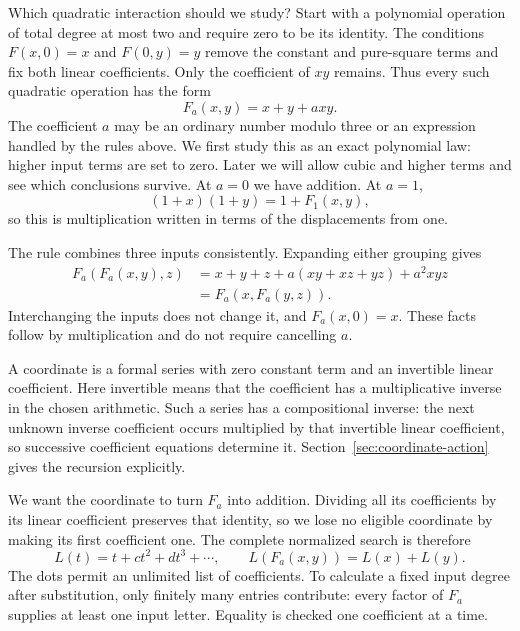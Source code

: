\documentclass[11pt,letterpaper]{article}
\numberwithin{equation}{section}
\theoremstyle{definition}\newtheorem{example}[theorem]{Example}
\begin{document}
Which quadratic interaction should we study? Start with a polynomial operation of total degree at most two and require zero to be its identity. The conditions \(F(x,0)=x\) and \(F(0,y)=y\) remove the constant and pure-square terms and fix both linear coefficients. Only the coefficient of \(xy\) remains. Thus every such quadratic operation has the form
\begin{equation}\label{eq:family}
 F_a(x,y)=x+y+a xy.
\end{equation}
The coefficient \(a\) may be an ordinary number modulo three or an expression handled by the rules above. We first study this as an exact polynomial law: higher input terms are set to zero. Later we will allow cubic and higher terms and see which conclusions survive. At \(a=0\) we have addition. At \(a=1\),
\[
 (1+x)(1+y)=1+F_1(x,y),
\]
so this is multiplication written in terms of the displacements from one.

The rule combines three inputs consistently. Expanding either grouping gives
\begin{align*}
 F_a(F_a(x,y),z)
 &=x+y+z+a(xy+xz+yz)+a^2xyz\\
 &=F_a(x,F_a(y,z)).
\end{align*}
Interchanging the inputs does not change it, and \(F_a(x,0)=x\). These facts follow by multiplication and do not require cancelling \(a\).

A coordinate is a formal series with zero constant term and an invertible linear coefficient. Here invertible means that the coefficient has a multiplicative inverse in the chosen arithmetic. Such a series has a compositional inverse: the next unknown inverse coefficient occurs multiplied by that invertible linear coefficient, so successive coefficient equations determine it. Section~\ref{sec:coordinate-action} gives the recursion explicitly.

We want the coordinate to turn \(F_a\) into addition. Dividing all its coefficients by its linear coefficient preserves that identity, so we lose no eligible coordinate by making its first coefficient one. The complete normalized search is therefore
\begin{equation}\label{eq:log-identity}
 L(t)=t+c t^2+d t^3+\cdots,
 \qquad L(F_a(x,y))=L(x)+L(y).
\end{equation}
The dots permit an unlimited list of coefficients. To calculate a fixed input degree after substitution, only finitely many entries contribute: every factor of \(F_a\) supplies at least one input letter. Equality is checked one coefficient at a time.
\end{document}
